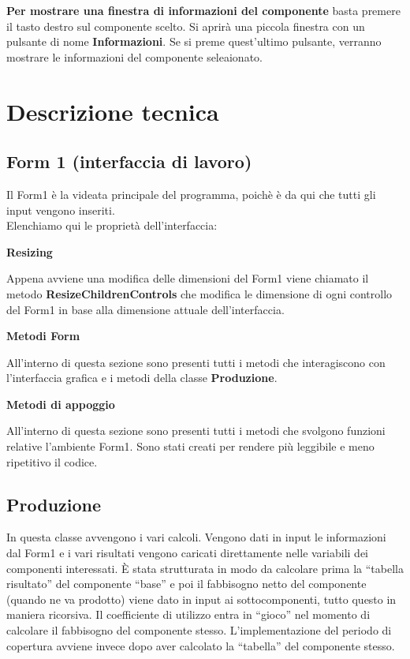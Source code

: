 \documentclass[12pt,twoside]{report}
\begin{document}
\bigskip
\textbf{Per mostrare una finestra di informazioni del componente} basta premere il tasto destro sul componente scelto. Si aprirà una piccola finestra con un pulsante di nome \textbf{Informazioni}.
Se si preme quest'ultimo pulsante, verranno mostrare le informazioni del componente seleaionato.


\section{Descrizione tecnica}

\subsection{Form 1 (interfaccia di lavoro)}

Il Form1 è la videata principale del programma, poichè è da qui che tutti gli input vengono inseriti.\\
Elenchiamo qui le proprietà dell'interfaccia:

\bigskip
\textbf{Resizing}

Appena avviene una modifica delle dimensioni del Form1 viene chiamato il metodo \textbf{ResizeChildrenControls} che modifica le dimensione di ogni controllo del Form1 in base alla dimensione attuale dell’interfaccia.

\bigskip
\textbf{Metodi Form}

All’interno di questa sezione sono presenti tutti i metodi che interagiscono con l’interfaccia grafica e i metodi della classe \textbf{Produzione}. 

\bigskip
\textbf{Metodi di appoggio}

All’interno di questa sezione sono presenti tutti i metodi che svolgono funzioni relative l’ambiente Form1. Sono stati creati per rendere più leggibile e meno ripetitivo il codice.


\subsection{Produzione}

In questa classe avvengono i vari calcoli. Vengono dati in input le informazioni dal Form1 e i vari risultati vengono caricati direttamente nelle variabili dei componenti interessati. È stata strutturata in modo da calcolare prima la “tabella risultato” del componente “base” e poi il fabbisogno netto del componente (quando ne va prodotto) viene dato in input ai sottocomponenti, tutto questo in maniera ricorsiva.
Il coefficiente di utilizzo entra in “gioco” nel momento di calcolare il fabbisogno del componente stesso. 
L’implementazione del periodo di copertura avviene invece dopo aver calcolato la “tabella” del componente stesso.
\end{document}
